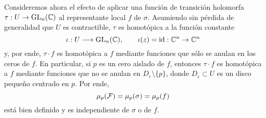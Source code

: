 Consideremos ahora el efecto de aplicar una función de transición holomorfa $\tau : U \to \operatorname{GL}_n(\mathbb C)$ al representante local $f$ de $\sigma$. Asumiendo sin pérdida de generalidad que $U$ es contractible, $\tau$ es homotópica a la función constante
$$\iota : U \longrightarrow \operatorname{GL}_n(\mathbb C), \qquad \iota(z) = \operatorname{id} : \mathbb C^n \to \mathbb C^n$$
y, por ende, $\tau \cdot f$ es homotópica a $f$ mediante funciones que sólo se anulan en los ceros de $f$. En particular, si $p$ es un cero aislado de $f$, entonces $\tau \cdot f$ es homotópica a $f$ mediante funciones que no se anulan en $D_\varepsilon \setminus \{ p \}$, donde $D_\varepsilon \subset U$ es un disco pequeño centrado en $p$. Por ende,
$$\mu_p(\mathcal F) = \mu_p(\sigma) = \mu_p(f)$$
está bien definido y es independiente de $\sigma$ o de $f$.
